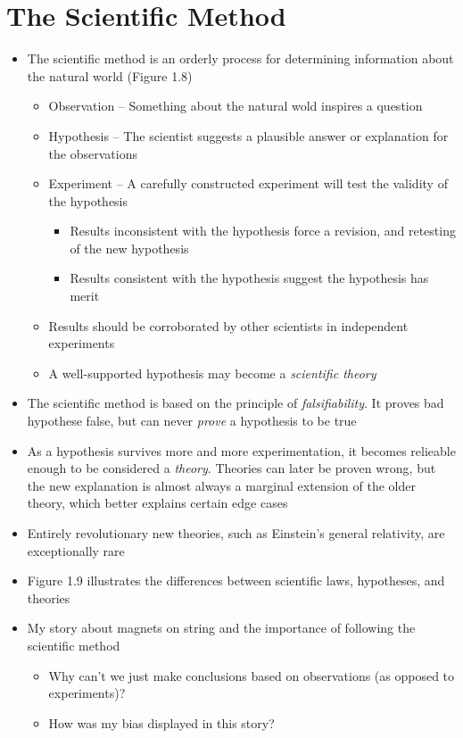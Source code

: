 \documentclass[12pt, openany, letterpaper]{memoir}
\begin{document}
\section{The Scientific Method}
\begin{itemize}
	\item The scientific method is an orderly process for determining information about the natural world (Figure 1.8)
	      \begin{itemize}
		      \item Observation -- Something about the natural wold inspires a question
		      \item Hypothesis -- The scientist suggests a plausible answer or explanation for the observations
		      \item Experiment -- A carefully constructed experiment will test the validity of the hypothesis
		            \begin{itemize}
			            \item Results inconsistent with the hypothesis force a revision, and retesting of the new hypothesis
			            \item Results consistent with the hypothesis suggest the hypothesis has merit
		            \end{itemize}
		      \item Results should be corroborated by other scientists in independent experiments
		      \item A well-supported hypothesis may become a \emph{scientific theory}
	      \end{itemize}
	\item The scientific method is based on the principle of \emph{falsifiability}. It proves bad hypothese false, but can never \emph{prove} a hypothesis to be true
	\item As a hypothesis survives more and more experimentation, it becomes relieable enough to be considered a \emph{theory}. Theories can later be proven wrong, but the new explanation is almost always a marginal extension of the older theory, which better explains certain edge cases
	\item Entirely revolutionary new theories, such as Einstein's general relativity, are exceptionally rare
	\item Figure 1.9 illustrates the differences between scientific laws, hypotheses, and theories
	\item My story about magnets on string and the importance of following the scientific method
	      \begin{itemize}
		      \item Why can't we just make conclusions based on observations (as opposed to experiments)?
		      \item How was my bias displayed in this story?
	      \end{itemize}
\end{itemize}
\end{document}
